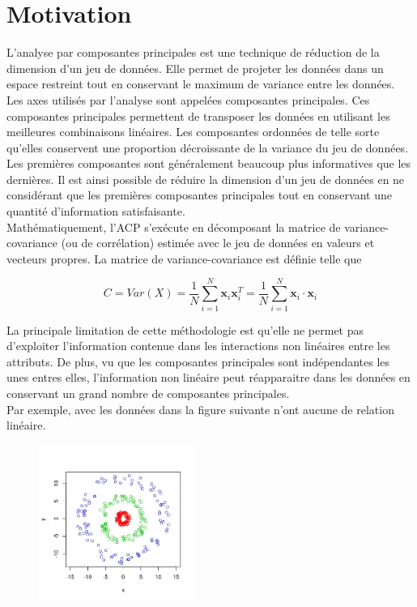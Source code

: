 \section{Motivation}

L’analyse par composantes principales est une technique de réduction de la dimension d’un jeu de données. Elle permet de projeter les données dans un espace restreint tout en conservant le maximum de variance entre les données. Les axes utilisés par l’analyse sont appelées composantes principales. Ces composantes principales permettent de transposer les données en utilisant les meilleures combinaisons linéaires. Les composantes ordonnées de telle sorte qu’elles conservent une proportion décroissante de la variance du jeu de données. Les premières composantes sont généralement beaucoup plus informatives que les dernières. Il est ainsi possible de réduire la dimension d’un jeu de données en ne considérant que les premières composantes principales tout en conservant une quantité d’information satisfaisante.\\

Mathématiquement, l’ACP s'exécute en décomposant la matrice de variance-covariance (ou de corrélation) estimée avec le jeu de données en valeurs et vecteurs propres. La matrice de variance-covariance est définie telle que

$$C = Var(X) = \frac{1}{N} \sum_{i = 1}^{N}   \textbf{x}_i\textbf{x}_i^{T} = \frac{1}{N} \sum_{i = 1}^{N}   \textbf{x}_i \cdot \textbf{x}_i$$

La principale limitation de cette méthodologie est qu’elle ne permet pas d’exploiter l’information contenue dans les interactions non linéaires entre les attributs. De plus, vu que les composantes principales sont indépendantes les unes entres elles, l'information non linéaire peut réapparaitre dans les données en conservant un grand nombre de composantes principales. \\

Par exemple, avec les données dans la figure suivante n'ont aucune de relation linéaire. 

\begin{figure}[H]
	\centering
	\includegraphics[width=2in]{sim-cercle}
\end{figure}

